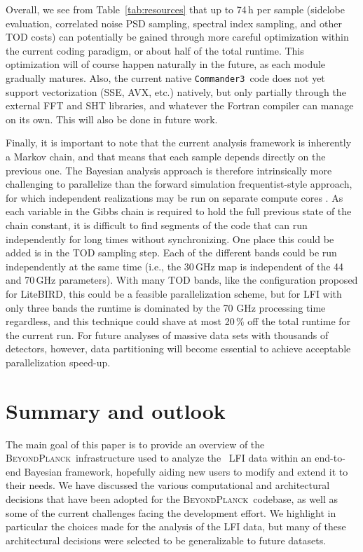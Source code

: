 \documentclass[twocolumn]{aa}
\def\commanderthree{\texttt{Commander3}}
\newcommand{\BP}{\textsc{BeyondPlanck}}
\begin{document}
Overall, we see from Table~\ref{tab:resources} that up to 74\,h per
sample (sidelobe evaluation, correlated noise PSD sampling, spectral
index sampling, and other TOD costs) can potentially be gained through
more careful optimization within the current coding paradigm, or about
half of the total runtime. This optimization will of course happen
naturally in the future, as each module gradually matures. Also, the
current native \commanderthree\ code does not yet support
vectorization (SSE, AVX, etc.) natively, but only partially through
the external FFT and SHT libraries, and whatever the Fortran compiler
can manage on its own. This will also be done in future work.

Finally, it is important to note that the current analysis framework
is inherently a Markov chain, and that means that each sample depends
directly on the previous one. The Bayesian analysis approach is
therefore intrinsically more challenging to parallelize than the
forward simulation frequentist-style approach, for which independent
realizations may be run on separate compute cores
\citep[e.g.,][]{planck2014-a14}. As each variable in the Gibbs chain
is required to hold the full previous state of the chain constant, it
is difficult to find segments of the code that can run independently
for long times without synchronizing. One place this could be added is
in the TOD sampling step. Each of the different bands could be run
independently at the same time (i.e., the 30\,GHz map is independent
of the 44 and 70\,GHz parameters). With many TOD bands, like the
configuration proposed for LiteBIRD, this could be a feasible
parallelization scheme, but for LFI with only three bands the runtime
is dominated by the 70 GHz processing time regardless, and this
technique could shave at most 20\,\% off the total runtime for the
current run. For future analyses of massive data sets with thousands
of detectors, however, data partitioning will become essential to
achieve acceptable parallelization speed-up.

\section{Summary and outlook}
\label{sec:conclusions}

The main goal of this paper is to provide an overview of the
\BP\ infrastructure used to analyze the \Planck\ LFI data within an
end-to-end Bayesian framework, hopefully aiding new users to modify
and extend it to their needs. We have discussed the various
computational and architectural decisions that have been adopted for
the \BP\ codebase, as well as some of the current challenges facing
the development effort. We highlight in particular the choices made
for the analysis of the LFI data, but many of these architectural
decisions were selected to be generalizable to future datasets.
\end{document}
